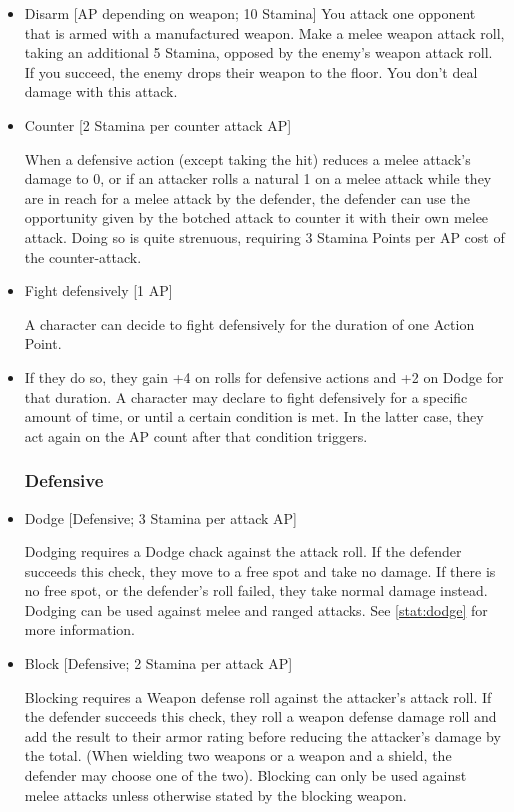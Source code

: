 \begin{itemize}
\item Disarm [AP depending on weapon; 10 Stamina]
You attack one opponent that is armed with a manufactured weapon.
Make a melee weapon attack roll, taking an additional 5 Stamina, opposed by the enemy's weapon attack roll.
If you succeed, the enemy drops their weapon to the floor.
You don't deal damage with this attack.\\


\item Counter [2 Stamina per counter attack AP]

When a defensive action (except taking the hit) reduces a melee attack's damage to 0, or if an attacker rolls a natural 1 on a melee attack while they are in reach for a melee attack by the defender, the defender can use the opportunity given by the botched attack to counter it with their own melee attack.
Doing so is quite strenuous, requiring 3 Stamina Points per AP cost of the counter-attack.


\item Fight defensively [1 AP]

A character can decide to fight defensively for the duration of one Action Point.

\item If they do so, they gain +4 on rolls for defensive actions and +2 on Dodge for that duration.
A character may declare to fight defensively for a specific amount of time, or until a certain condition is met.
In the latter case, they act again on the AP count after that condition triggers.

\subsubsection{Defensive}


\item Dodge [Defensive; 3 Stamina per attack AP]

Dodging requires a Dodge chack against the attack roll.
If the defender succeeds this check, they move  to a free spot and take no damage.
If there is no free spot, or the defender's roll failed, they take normal damage instead.
Dodging can be used against melee and ranged attacks.
See \ref{stat:dodge} for more information.

\item Block [Defensive; 2 Stamina per attack AP]

Blocking requires a Weapon defense roll against the attacker's attack roll.
If the defender succeeds this check, they roll a weapon defense damage roll and add the result to their armor rating before reducing the attacker's damage by the total.
(When wielding two weapons or a weapon and a shield, the defender may choose one of the two).
Blocking can only be used against melee attacks unless otherwise stated by the blocking weapon.


\end{itemize}

